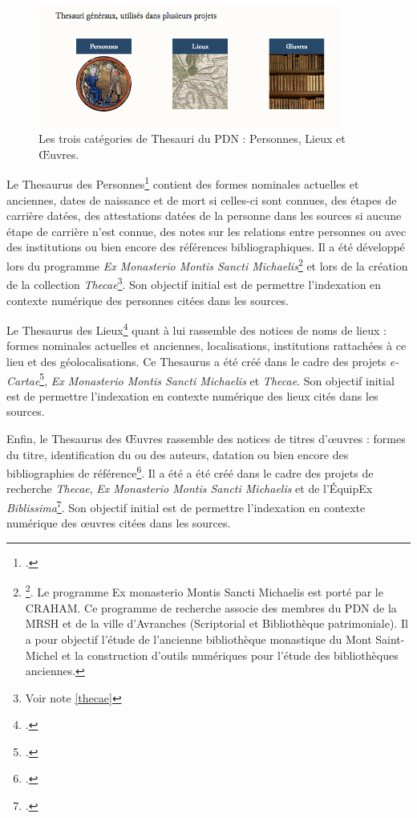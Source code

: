 \documentclass[a4paper,12pt,twoside]{book}
\begin{document}
\begin{figure}[H]
    \centering
    \includegraphics[width=10cm]{img/thesauris/thesau_generaux.png}
    \caption[Les trois catégories de Thesauri du \acrshort{PDN} : Personnes, Lieux et \OE{}uvres]{Les trois catégories de Thesauri du \acrshort{PDN} : Personnes, Lieux et \OE{}uvres.\footnotemark}
\end{figure}


Le Thesaurus des Personnes\footcite{thesau_pers} contient des \og formes nominales actuelles et anciennes, dates de naissance et de mort si celles-ci sont connues, des étapes de carrière datées, des attestations datées de la personne dans les sources si aucune étape de carrière n'est connue, des notes sur les relations entre personnes ou avec des institutions ou bien encore des références bibliographiques\fg. Il a été développé lors du programme \textit{Ex Monasterio Montis Sancti Michaelis}\footnote{\footcite{monasterio}. Le programme Ex monasterio Montis Sancti Michaelis est porté par le CRAHAM. Ce programme de recherche associe des membres du \acrshort{PDN} de la \acrshort{MRSH} et de la ville d'Avranches (Scriptorial et Bibliothèque patrimoniale). Il a pour objectif l'étude de l'ancienne bibliothèque monastique du Mont Saint-Michel et la construction d'outils numériques pour l'étude des bibliothèques anciennes.} et lors de la création de la collection \textit{Thecae}\footnote{Voir note \ref{thecae}}. Son objectif initial est de permettre l'indexation en contexte numérique des personnes citées dans les sources.


Le Thesaurus des Lieux\footcite{thesau_lieu} quant à lui rassemble \og des notices de noms de lieux : formes nominales actuelles et anciennes, localisations, institutions rattachées à ce lieu et des géolocalisations\fg. Ce Thesaurus a été créé dans le cadre des projets \textit{e-Cartae}\footcite{ecartae}, \textit{Ex Monasterio Montis Sancti Michaelis} et \textit{Thecae}. Son objectif initial est de permettre l'indexation en contexte numérique des lieux cités dans les sources.

Enfin, le Thesaurus des \OE{}uvres rassemble \og des notices de titres d'\oe{}uvres : formes du titre, identification du ou des auteurs, datation ou bien encore des bibliographies de référence\fg\footcite{thesau_oeuvre}. Il a été a été créé dans le cadre des projets de recherche \textit{Thecae}, \textit{Ex Monasterio Montis Sancti Michaelis} et de l'ÉquipEx \textit{Biblissima}\footcite{Biblissima}. Son objectif initial est de permettre l'indexation en contexte numérique des \oe{}uvres citées dans les sources.
\end{document}
